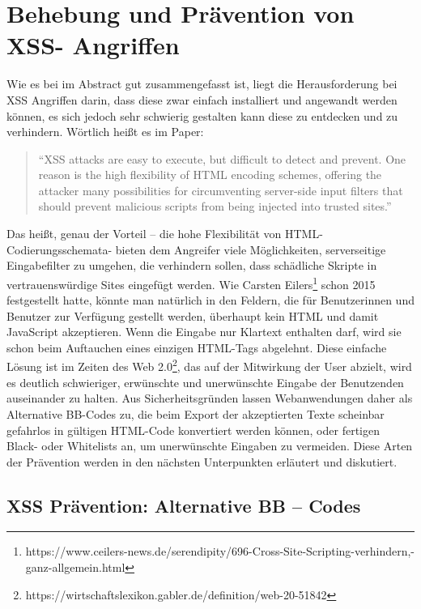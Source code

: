 \section{Behebung und Prävention von XSS- Angriffen}
\label{section:prevention_of_xss_attacks}

Wie es bei \textcite{kirda2009} im Abstract gut zusammengefasst ist, liegt die Herausforderung bei XSS Angriffen darin, dass diese zwar einfach installiert und angewandt werden können, es sich jedoch sehr schwierig gestalten kann diese zu entdecken und zu verhindern. Wörtlich heißt es im Paper:

\begin{quote}
``XSS attacks are easy to execute, but difficult to detect and prevent. One reason is the high flexibility of HTML encoding schemes, offering the attacker many possibilities for circumventing server-side input filters that should prevent malicious scripts from being injected into trusted sites.''

\autocite[592]{kirda2009}
\end{quote}

Das heißt, genau der Vorteil – die hohe Flexibilität von HTML-Codierungsschemata- bieten dem Angreifer viele Möglichkeiten, serverseitige Eingabefilter zu umgehen, die verhindern sollen, dass schädliche Skripte in vertrauenswürdige Sites eingefügt werden.
Wie Carsten Eilers\footnote{https://www.ceilers-news.de/serendipity/696-Cross-Site-Scripting-verhindern,-ganz-allgemein.html} schon 2015 festgestellt hatte, könnte man natürlich in den Feldern, die für Benutzerinnen und Benutzer zur Verfügung gestellt werden, überhaupt kein HTML und damit JavaScript akzeptieren. Wenn die Eingabe nur Klartext enthalten darf, wird sie schon beim Auftauchen eines einzigen HTML-Tags abgelehnt. Diese einfache Lösung ist im Zeiten des Web 2.0\footnote{https://wirtschaftslexikon.gabler.de/definition/web-20-51842}, das auf der Mitwirkung der User abzielt, wird es deutlich schwieriger, erwünschte und unerwünschte Eingabe der Benutzenden auseinander zu halten. Aus Sicherheitsgründen lassen Webanwendungen daher als Alternative BB-Codes zu, die beim Export der akzeptierten Texte scheinbar gefahrlos in gültigen HTML-Code konvertiert werden können, oder fertigen Black- oder Whitelists an, um unerwünschte Eingaben zu vermeiden. Diese Arten der Prävention werden in den nächsten Unterpunkten erläutert und diskutiert.

\subsection{XSS Prävention: Alternative BB – Codes}
\label{subsection:prevention_bb-codes}

